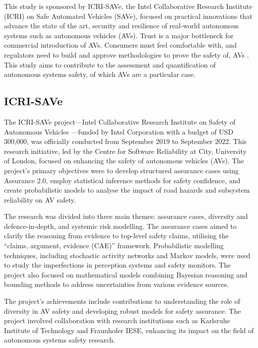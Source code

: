 This study is sponsored by ICRI-SAVe, the Intel Collaborative Research Institute (ICRI) on Safe Automated Vehicles (SAVe), focused on practical innovations that advance the state of the art, security and resilience of real-world autonomous systems such as autonomous vehicles (AVs). Trust is a major bottleneck for commercial introduction of AVs. Consumers must feel comfortable with, and regulators need to build and approve methodologies to prove the safety of, AVs \cite{ICRI-SAVe2024}. %
This study aims to contribute to the assessment and quantification of autonomous systems safety, of which AVs are a particular case.

\subsection{ICRI-SAVe}

The ICRI-SAVe project—Intel Collaborative Research Institute on Safety of Autonomous Vehicles \cite{ICRI-SAVe2024}—funded by Intel Corporation with a budget of USD 300,000, was officially conducted from September 2019 to September 2022. This research initiative, led by the Centre for Software Reliability at City, University of London, focused on enhancing the safety of autonomous vehicles (AVs). The project's primary objectives were to develop structured assurance cases using Assurance 2.0, employ statistical inference methods for safety confidence, and create probabilistic models to analyse the impact of road hazards and subsystem reliability on AV safety.

The research was divided into three main themes: assurance cases, diversity and defence-in-depth, and systemic risk modelling. The assurance cases aimed to clarify the reasoning from evidence to top-level safety claims, utilising the ``claims, argument, evidence (CAE)'' framework. Probabilistic modelling techniques, including stochastic activity networks and Markov models, were used to study the imperfections in perception systems and safety monitors. The project also focused on mathematical models combining Bayesian reasoning and bounding methods to address uncertainties from various evidence sources.

The project's achievements include contributions to understanding the role of diversity in AV safety and developing robust models for safety assurance. The project involved collaboration with research institutions such as Karlsruhe Institute of Technology and Fraunhofer IESE, enhancing its impact on the field of autonomous systems safety research.

